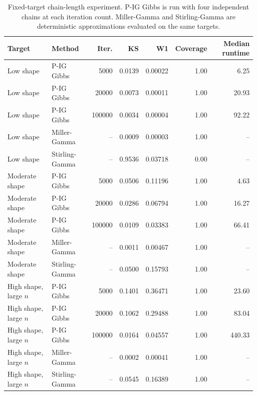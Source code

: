 \begin{table}[t]
        \centering
        \small
        \caption{Fixed-target chain-length experiment.  P-IG Gibbs is run with
        four independent chains at each iteration count.  Miller-Gamma and
        Stirling-Gamma are deterministic approximations evaluated on the same
        targets.}
        \label{tab:gamma-shape-exactness}
        \begin{tabular}{@{}llrrrrr@{}}
                \toprule
                Target & Method & Iter. & KS & W1 & Coverage & Median runtime \\
                \midrule
                Low shape & P-IG Gibbs & 5000   & 0.0139 & 0.00022 & 1.00 & 6.25 \\
                Low shape & P-IG Gibbs & 20000  & 0.0073 & 0.00011 & 1.00 & 20.93 \\
                Low shape & P-IG Gibbs & 100000 & 0.0034 & 0.00004 & 1.00 & 92.22 \\
                Low shape & Miller-Gamma   & -- & 0.0009 & 0.00003 & 1.00 & -- \\
                Low shape & Stirling-Gamma & -- & 0.9536 & 0.03718 & 0.00 & -- \\
                \midrule
                Moderate shape & P-IG Gibbs & 5000   & 0.0506 & 0.11196 & 1.00 & 4.63 \\
                Moderate shape & P-IG Gibbs & 20000  & 0.0286 & 0.06794 & 1.00 & 16.27 \\
                Moderate shape & P-IG Gibbs & 100000 & 0.0109 & 0.03383 & 1.00 & 66.41 \\
                Moderate shape & Miller-Gamma   & -- & 0.0011 & 0.00467 & 1.00 & -- \\
                Moderate shape & Stirling-Gamma & -- & 0.0500 & 0.15793 & 1.00 & -- \\
                \midrule
                High shape, large $n$ & P-IG Gibbs & 5000   & 0.1401 & 0.36471 & 1.00 & 23.60 \\
                High shape, large $n$ & P-IG Gibbs & 20000  & 0.1062 & 0.29488 & 1.00 & 83.04 \\
                High shape, large $n$ & P-IG Gibbs & 100000 & 0.0164 & 0.04557 & 1.00 & 440.33 \\
                High shape, large $n$ & Miller-Gamma   & -- & 0.0002 & 0.00041 & 1.00 & -- \\
                High shape, large $n$ & Stirling-Gamma & -- & 0.0545 & 0.16389 & 1.00 & -- \\
                \bottomrule
        \end{tabular}
\end{table}

